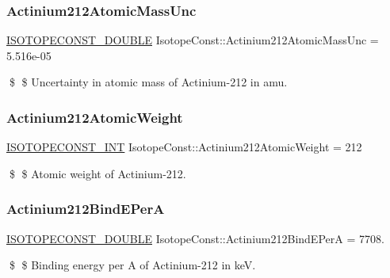 \subsubsection{\texorpdfstring{Actinium212\+Atomic\+Mass\+Unc}{Actinium212AtomicMassUnc}}
{\footnotesize\ttfamily \mbox{\hyperlink{group___isotope_const-_macros_ga8f45a7272ce02c0b4c65c44636ed719a}{I\+S\+O\+T\+O\+P\+E\+C\+O\+N\+S\+T\+\_\+\+D\+O\+U\+B\+LE}} Isotope\+Const\+::\+Actinium212\+Atomic\+Mass\+Unc = 5.\+516e-\/05}

\$ \$ Uncertainty in atomic mass of Actinium-\/212 in amu. \mbox{\label{group___isotope_const-_actinium-_ac212_ga0ee2320dfc0d9dd3e02677d431d513bf}} 
\subsubsection{\texorpdfstring{Actinium212\+Atomic\+Weight}{Actinium212AtomicWeight}}
{\footnotesize\ttfamily \mbox{\hyperlink{group___isotope_const-_macros_ga5f18360b3e99483a35c32d789e62621c}{I\+S\+O\+T\+O\+P\+E\+C\+O\+N\+S\+T\+\_\+\+I\+NT}} Isotope\+Const\+::\+Actinium212\+Atomic\+Weight = 212}

\$ \$ Atomic weight of Actinium-\/212. \mbox{\label{group___isotope_const-_actinium-_ac212_ga9c85d8b0eac3c6a2cd66dd4461e3513d}} 
\subsubsection{\texorpdfstring{Actinium212\+Bind\+E\+PerA}{Actinium212BindEPerA}}
{\footnotesize\ttfamily \mbox{\hyperlink{group___isotope_const-_macros_ga8f45a7272ce02c0b4c65c44636ed719a}{I\+S\+O\+T\+O\+P\+E\+C\+O\+N\+S\+T\+\_\+\+D\+O\+U\+B\+LE}} Isotope\+Const\+::\+Actinium212\+Bind\+E\+PerA = 7708.}

\$ \$ Binding energy per A of Actinium-\/212 in keV. \mbox{\label{group___isotope_const-_actinium-_ac212_ga7e93acb33e4070f67624d088702bd11b}} 
